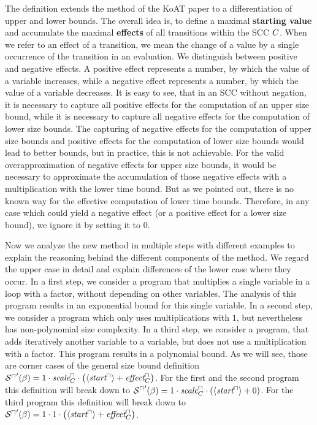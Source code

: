 The definition extends the method of the KoAT paper \cite{koat} to a differentiation of upper and lower bounds.
The overall idea is, to define a maximal \textbf{starting value} and accumulate the maximal \textbf{effects} of all transitions within the SCC $C$.
When we refer to an effect of a transition, we mean the change of a value by a single occurrence of the transition in an evaluation.
We distinguish between positive and negative effects.
A positive effect represents a number, by which the value of a variable increases, while a negative effect represents a number, by which the value of a variable decreases.
It is easy to see, that in an SCC without negation, it is necessary to capture all positive effects for the computation of an upper size bound, while it is necessary to capture all negative effects for the computation of lower size bounds.
The capturing of negative effects for the computation of upper size bounds and positive effects for the computation of lower size bounds would lead to better bounds, but in practice, this is not achievable.
For the valid overapproximation of negative effects for upper size bounds, it would be necessary to approximate the accumulation of those negative effects with a multiplication with the lower time bound.
But as we pointed out, there is no known way for the effective computation of lower time bounds.
Therefore, in any case which could yield a negative effect (or a positive effect for a lower size bound), we ignore it by setting it to $0$.

Now we analyze the new method in multiple steps with different examples to explain the reasoning behind the different components of the method.
We regard the upper case in detail and explain differences of the lower case where they occur.
In a first step, we consider a program that multiplies a single variable in a loop with a factor, without depending on other variables.
The analysis of this program results in an exponential bound for this single variable.
In a second step, we consider a program which only uses multiplications with $1$, but nevertheless has non-polynomial size complexity.
In a third step, we consider a program, that adds iteratively another variable to a variable, but does not use a multiplication with a factor.
This program results in a polynomial bound.
As we will see, those are corner cases of the general size bound definition ${\mathcal{S}^\sqcap}'(\beta) = 1 \cdot \emph{scale}^\sqcap_C \cdot \left( \langle\emph{start}^\sqcap\rangle + \emph{effect}^\sqcap_C \right)$.
For the first and the second program this definition will break down to ${\mathcal{S}^\sqcap}'(\beta) = 1 \cdot \emph{scale}^\sqcap_C \cdot \left( \langle\emph{start}^\sqcap\rangle + 0 \right)$.
For the third program this definition will break down to ${\mathcal{S}^\sqcap}'(\beta) = 1 \cdot 1 \cdot \left( \langle\emph{start}^\sqcap\rangle + \emph{effect}^\sqcap_C \right)$.

